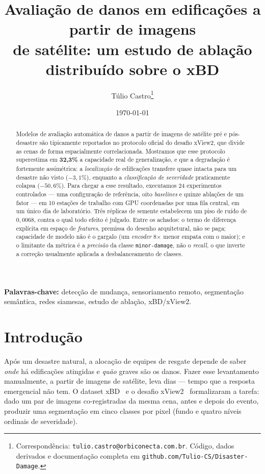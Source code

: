 \documentclass[11pt,a4paper]{article}
\title{\textbf{Avaliação de danos em edificações a partir de imagens\\
de satélite: um estudo de ablação distribuído sobre o xBD}}
\author{Túlio Castro\thanks{Correspondência: \texttt{tulio.castro@orbiconecta.com.br}.
Código, dados derivados e documentação completa em
\texttt{github.com/Tulio-CS/Disaster-Damage}.}}
\date{\today}
\begin{document}
\maketitle

\begin{abstract}
\noindent
Modelos de avaliação automática de danos a partir de imagens de satélite pré e
pós-desastre são tipicamente reportados no protocolo oficial do desafio xView2,
que divide as cenas de forma espacialmente correlacionada. Mostramos que esse
protocolo superestima em \textbf{32{,}3\%} a capacidade real de generalização, e
que a degradação é fortemente assimétrica: a \emph{localização} de edificações
transfere quase intacta para um desastre não visto ($-3{,}1\%$), enquanto a
\emph{classificação de severidade} praticamente colapsa ($-50{,}6\%$). Para
chegar a esse resultado, executamos 24 experimentos controlados --- uma
configuração de referência, oito \emph{baselines} e quinze ablações de um fator
--- em 10 estações de trabalho com GPU coordenadas por uma fila central, em um
único dia de laboratório. Três réplicas de semente estabelecem um piso de ruído
de $0{,}0068$, contra o qual todo efeito é julgado. Entre os achados: o termo de
diferença explícita em espaço de \emph{features}, premissa do desenho
arquitetural, não se paga; capacidade de modelo não é o gargalo (um
\emph{encoder} 8$\times$ menor empata com o maior); e o limitante da métrica é a
\emph{precisão} da classe \texttt{minor-damage}, não o \emph{recall}, o que
inverte a correção usualmente aplicada a desbalanceamento de classes.
\end{abstract}

\vspace{0.5em}
\noindent\textbf{Palavras-chave:} detecção de mudança, sensoriamento remoto,
segmentação semântica, redes siamesas, estudo de ablação, xBD/xView2.

\section{Introdução}

Após um desastre natural, a alocação de equipes de resgate depende de saber
\emph{onde} há edificações atingidas e \emph{quão} graves são os danos. Fazer
esse levantamento manualmente, a partir de imagens de satélite, leva dias ---
tempo que a resposta emergencial não tem. O dataset xBD~\cite{gupta2019} e o
desafio xView2~\cite{xview2} formalizaram a tarefa: dado um par de imagens
co-registradas da mesma cena, antes e depois do evento, produzir uma segmentação
em cinco classes por pixel (fundo e quatro níveis ordinais de severidade).
\end{document}

